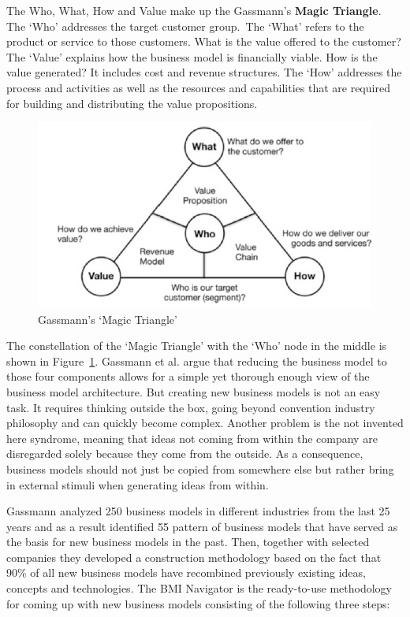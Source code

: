 		The Who, What, How and Value make up the Gassmann's \textbf{Magic Triangle}. The `Who' addresses the target customer group.~The `What' refers to the product or service to those customers. What is the value offered to the customer? The `Value' explains how the business model is financially viable. How is the value generated? It includes cost and revenue structures. The `How' addresses the process and activities as well as the resources and capabilities that are required for building and distributing the value propositions.		
		\vspace{15mm}
		\begin{figure}[ht]
		    \begin{center}
		    \includegraphics[scale=0.6]{Talk11/Figure1.png}
		    \end{center}
		    \caption{Gassmann's `Magic Triangle' \cite[p.~91]{gassmann55}}
		    \label{fig:m_triangle}
		\end{figure}
 		\vspace{15mm}
		The constellation of the `Magic Triangle' with the `Who' node in the middle is shown in Figure~\ref{fig:m_triangle}. Gassmann et al. argue that reducing the business model to those four components allows for a simple yet thorough enough view of the business model architecture. But creating new business models is not an easy task. It requires thinking outside the box, going beyond convention industry philosophy and can quickly become complex. Another problem is the not invented here syndrome, meaning that ideas not coming from within the company are disregarded solely because they come from the outside. As a consequence, business models should not just be copied from somewhere else but rather bring in external stimuli when generating ideas from within.

		Gassmann analyzed 250 business models in different industries from the last 25 years and as a result identified 55 pattern of business models that have served as the basis for new business models in the past. Then, together with selected companies they developed a construction methodology based on the fact that 90\% of all new business models have recombined previously existing ideas, concepts and  technologies. The BMI Navigator is the ready-to-use methodology for coming up with new business models consisting of the following three steps:

